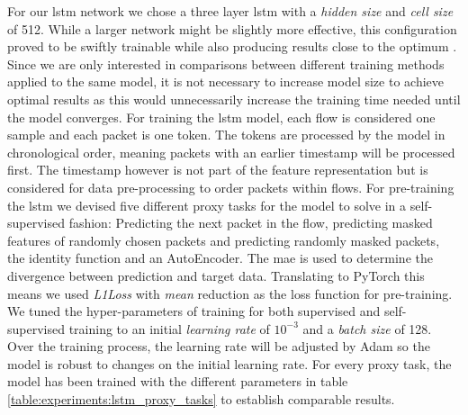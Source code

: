 For our \gls{lstm} network we chose a three layer \gls{lstm} with a \textit{hidden size} and \textit{cell size} of 512. While a larger network might be slightly more effective, this configuration proved to be swiftly trainable while also producing results close to the optimum . Since we are only interested in comparisons between different training methods applied to the same model, it is not necessary to increase model size to achieve optimal results as this would unnecessarily increase the training time needed until the model converges. For training the \gls{lstm} model, each flow is considered one sample and each packet is one token. The tokens are processed by the model in chronological order, meaning packets with an earlier timestamp will be processed first. The timestamp however is not part of the feature representation but is considered for data pre-processing to order packets within flows. For pre-training the \gls{lstm} we devised five different proxy tasks for the model to solve in a self-supervised fashion: Predicting the next packet in the flow, predicting masked features of randomly chosen packets and predicting randomly masked packets, the identity function and an AutoEncoder. The \gls{mae} is used to determine the divergence between prediction and target data. Translating to PyTorch this means we used \textit{L1Loss} with \textit{mean} reduction as the loss function for pre-training. We tuned the hyper-parameters of training for both supervised and self-supervised training to an initial \textit{learning rate} of $10^{-3}$ and a \textit{batch size} of 128. Over the training process, the learning rate will be adjusted by Adam so the model is robust to changes on the initial learning rate. For every proxy task, the model has been trained with the different parameters in table \ref{table:experiments:lstm_proxy_tasks} to establish comparable results.

